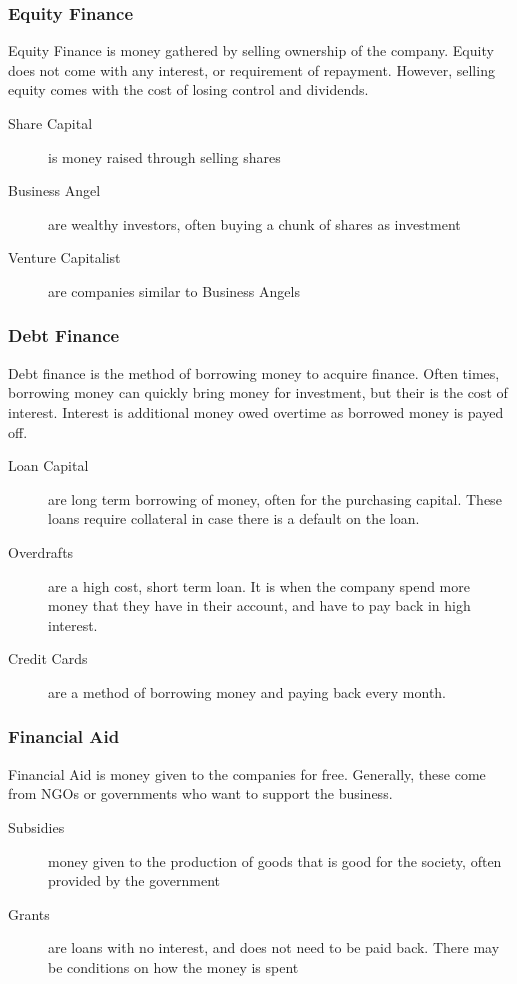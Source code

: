 \documentclass{standalone}
\begin{document}
\subsubsection{Equity Finance}
Equity Finance is money gathered by selling ownership of the company.
Equity does not come with any interest, or requirement of repayment.
However, selling equity comes with the cost of losing control and dividends.

\begin{description}
    \item[Share Capital] is money raised through selling shares
    \item[Business Angel] are wealthy investors, often buying a chunk of shares as investment
    \item[Venture Capitalist] are companies similar to Business Angels
\end{description}

\subsubsection{Debt Finance}
Debt finance is the method of borrowing money to acquire finance.
Often times, borrowing money can quickly bring money for investment, but their is the cost of interest.
Interest is additional money owed overtime as borrowed money is payed off.

\begin{description}
    \item[Loan Capital] are long term borrowing of money, often for the purchasing capital. These loans require collateral in case there is a default on the loan.
    \item[Overdrafts] are a high cost, short term loan. It is when the company spend more money that they have in their account, and have to pay back in high interest.
    \item[Credit Cards] are a method of borrowing money and paying back every month.
\end{description}

\subsubsection{Financial Aid}
Financial Aid is money given to the companies for free.
Generally, these come from NGOs or governments who want to support the business.

\begin{description}
    \item[Subsidies] money given to the production of goods that is good for the society, often provided by the government
    \item[Grants] are loans with no interest, and does not need to be paid back. There may be conditions on how the money is spent
\end{description}
\end{document}
